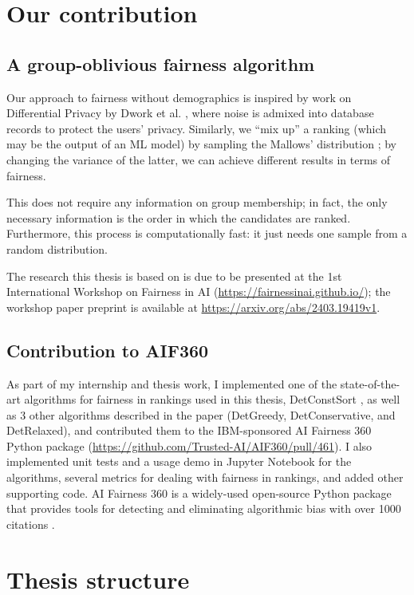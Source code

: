 \section{Our contribution}\label{sect:int_4}

\subsection{A group-oblivious fairness algorithm}

Our approach to fairness without demographics is inspired by work on Differential Privacy by Dwork et al. \cite{foundationsofDPDwork}, where noise is admixed into database records to protect the users’ privacy. Similarly, we “mix up” a ranking (which may be the output of an ML model) by sampling the Mallows’ distribution \cite{mallows}; by changing the variance of the latter, we can achieve different results in terms of fairness.

This does not require any information on group membership; in fact, the only necessary information is the order in which the candidates are ranked. Furthermore, this process is computationally fast: it just needs one sample from a random distribution.

The research this thesis is based on is due to be presented at the 1st International Workshop on Fairness in AI (\url{https://fairnessinai.github.io/}); the workshop paper preprint is available at \url{https://arxiv.org/abs/2403.19419v1}.

\subsection{Contribution to AIF360}

As part of my internship and thesis work, I implemented one of the state-of-the-art algorithms for fairness in rankings used in this thesis, DetConstSort \cite{linkedin}, as well as 3 other algorithms described in the paper (DetGreedy, DetConservative, and DetRelaxed), and contributed them to the IBM-sponsored AI Fairness 360 Python package (\url{https://github.com/Trusted-AI/AIF360/pull/461}). I also implemented unit tests and a usage demo in Jupyter Notebook for the algorithms, several metrics for dealing with fairness in rankings, and added other supporting code. AI Fairness 360 is a widely-used open-source Python package that provides tools for detecting and eliminating algorithmic bias with over 1000 citations \cite{8843908}.

\section{Thesis structure}\label{sect:structure}

